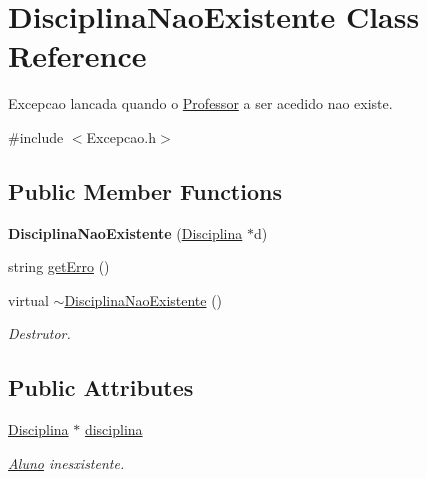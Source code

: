 \hypertarget{class_disciplina_nao_existente}{\section{Disciplina\-Nao\-Existente Class Reference}
\label{class_disciplina_nao_existente}
}


Excepcao lancada quando o \hyperlink{class_professor}{Professor} a ser acedido nao existe.  




{\ttfamily \#include $<$Excepcao.\-h$>$}

\subsection*{Public Member Functions}
\begin{DoxyCompactItemize}
\item 
\hypertarget{class_disciplina_nao_existente_a6a31b19d16df94d71d2ee360600d5150}{{\bfseries Disciplina\-Nao\-Existente} (\hyperlink{class_disciplina}{Disciplina} $\ast$d)}\label{class_disciplina_nao_existente_a6a31b19d16df94d71d2ee360600d5150}

\item 
string \hyperlink{class_disciplina_nao_existente_a6a201b94440edd339ec05d1e9db8319b}{get\-Erro} ()
\item 
\hypertarget{class_disciplina_nao_existente_a4c0655a54da71a17d8f0fba702cf374d}{virtual \hyperlink{class_disciplina_nao_existente_a4c0655a54da71a17d8f0fba702cf374d}{$\sim$\-Disciplina\-Nao\-Existente} ()}\label{class_disciplina_nao_existente_a4c0655a54da71a17d8f0fba702cf374d}

\begin{DoxyCompactList}\small\item\em Destrutor. \end{DoxyCompactList}\end{DoxyCompactItemize}
\subsection*{Public Attributes}
\begin{DoxyCompactItemize}
\item 
\hypertarget{class_disciplina_nao_existente_ad681e3d7b6ba5c6120b23084bf4ae657}{\hyperlink{class_disciplina}{Disciplina} $\ast$ \hyperlink{class_disciplina_nao_existente_ad681e3d7b6ba5c6120b23084bf4ae657}{disciplina}}\label{class_disciplina_nao_existente_ad681e3d7b6ba5c6120b23084bf4ae657}

\begin{DoxyCompactList}\small\item\em \hyperlink{class_aluno}{Aluno} inesxistente. \end{DoxyCompactList}\end{DoxyCompactItemize}


